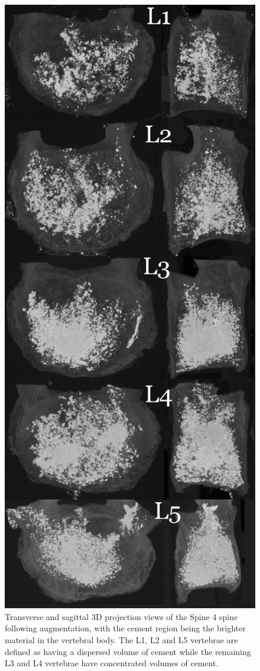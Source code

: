 \begin{figure}[ph!]
  \centering
 
\includegraphics[width=.65\textwidth]{Chapters/Chapter_HT_images/G41-11_projections}
	\caption{Transverse and sagittal 3D projection views of the Spine 4 spine
following augmentation, with the cement region being the brighter material in
the vertebral body. The L1, L2 and L5 vertebrae are defined as having a
dispersed volume of cement while the remaining L3 and L4 vertebrae have
concentrated volumes of cement.}
  \label{fig:Spine 4_projection}
\end{figure}


